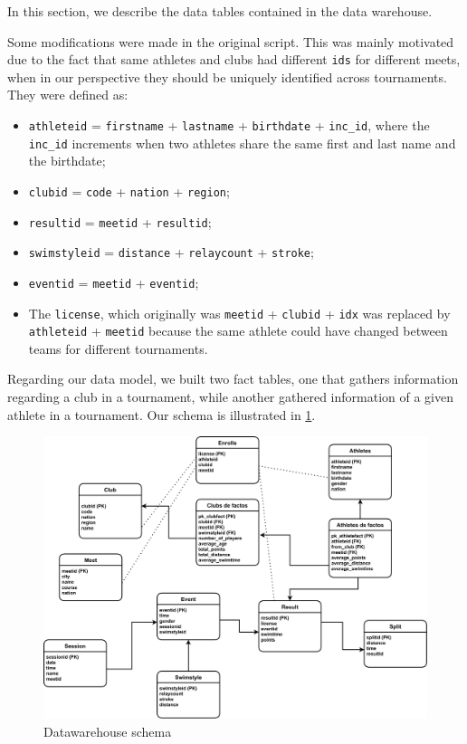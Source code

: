 \documentclass[a4paper, 11pt]{article}
\begin{document}
\vspace{\baselineskip}

In this section, we describe the data tables contained in the data warehouse. 

Some modifications were made in the original script. This was mainly motivated due to the fact that same athletes and clubs had different
\texttt{ids} for different meets, when in our perspective they should be uniquely identified across tournaments. They were defined as: 

\vspace{\baselineskip}

\begin{itemize}
    \item \texttt{athleteid} = \texttt{firstname} + \texttt{lastname} + \texttt{birthdate} + \texttt{inc\_id}, where the \texttt{inc\_id} increments when two athletes share the same first and last name and the birthdate;
    \item \texttt{clubid} = \texttt{code} + \texttt{nation} + \texttt{region};
    \item \texttt{resultid} = \texttt{meetid} + \texttt{resultid};
    \item \texttt{swimstyleid} = \texttt{distance} + \texttt{relaycount} + \texttt{stroke};
    \item \texttt{eventid} = \texttt{meetid} + \texttt{eventid};
    \item The \texttt{license}, which originally was \texttt{meetid} + \texttt{clubid} + \texttt{idx} was replaced by \texttt{athleteid} + \texttt{meetid} because the same athlete could have changed between teams for different tournaments.
\end{itemize}

\vspace{\baselineskip}

Regarding our data model, we built two fact tables, one that gathers information regarding a club in a tournament, while another gathered 
information of a given athlete in a tournament. Our schema is illustrated in \cref{fig:defact}. 

\begin{figure}[H]
    \centering
    \includegraphics[width=\textwidth]{img/datawarehouse.pdf}
    \caption{Datawarehouse schema}
    \label{fig:defact}
\end{figure}
\end{document}
